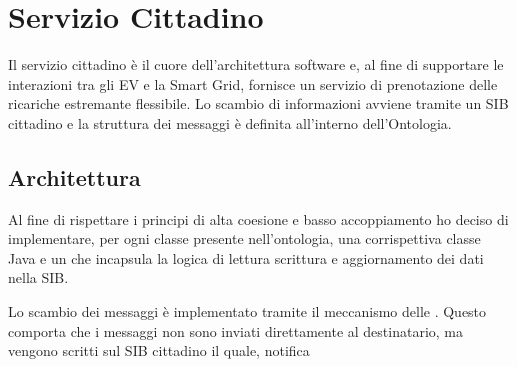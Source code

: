 \chapter{Servizio Cittadino}

Il servizio cittadino è il cuore dell'architettura software e, al fine di supportare le interazioni tra gli EV e la Smart Grid, fornisce un servizio di prenotazione delle ricariche estremante flessibile. Lo scambio di informazioni avviene tramite un SIB cittadino e la struttura dei messaggi è definita all'interno dell'Ontologia. 

\section{Architettura}

Al fine di rispettare i principi di alta coesione e basso accoppiamento ho deciso di implementare, per ogni classe presente nell'ontologia, una corrispettiva classe  Java e un  che incapsula la logica di lettura scrittura e aggiornamento dei dati nella SIB.

Lo scambio dei messaggi è implementato tramite il meccanismo delle . Questo comporta che i messaggi non sono inviati direttamente al destinatario, ma vengono scritti sul SIB cittadino il quale, notifica 

